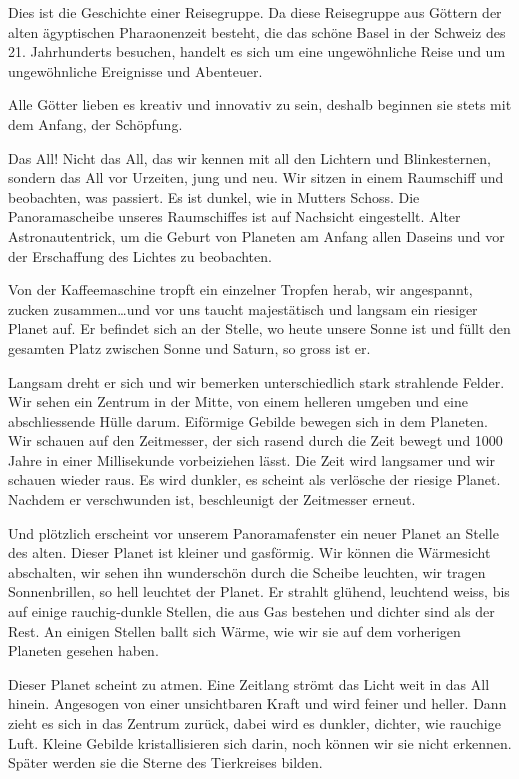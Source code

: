 \documentclass[11pt,titlepage,a5paper]{book}
\begin{document}
Dies ist die Geschichte einer Reisegruppe. Da diese Reisegruppe aus Göttern der alten ägyptischen Pharaonenzeit besteht, die das schöne Basel in der Schweiz des 21. Jahrhunderts besuchen, handelt es sich um eine ungewöhnliche Reise und um ungewöhnliche Ereignisse und Abenteuer. 

Alle Götter lieben es kreativ und innovativ zu sein, deshalb beginnen sie stets mit dem Anfang, der Schöpfung. 

Das All!  Nicht das All, das wir kennen mit all den Lichtern und Blinkesternen, sondern das All vor Urzeiten, jung und neu. Wir sitzen in einem Raumschiff und beobachten, was passiert. Es ist dunkel, wie in Mutters Schoss. Die Panoramascheibe unseres Raumschiffes ist auf Nachsicht eingestellt. Alter Astronautentrick, um die Geburt von Planeten am Anfang allen Daseins und vor der Erschaffung des Lichtes zu beobachten.

Von der Kaffeemaschine tropft ein einzelner Tropfen herab, wir angespannt, zucken zusammen\dots und vor uns taucht majestätisch und langsam ein riesiger Planet auf. Er befindet sich an der Stelle, wo heute unsere Sonne ist und füllt den gesamten Platz zwischen Sonne und Saturn, so gross ist er. 

Langsam dreht er sich und wir bemerken unterschiedlich stark strahlende Felder. Wir sehen ein Zentrum in der Mitte, von einem helleren umgeben und eine abschliessende Hülle darum. Eiförmige Gebilde  bewegen sich in dem Planeten. Wir schauen auf den Zeitmesser, der sich rasend durch die Zeit bewegt und 1000 Jahre in einer Millisekunde vorbeiziehen lässt. Die Zeit wird langsamer und wir schauen wieder raus. Es wird dunkler, es scheint als verlösche der riesige Planet. Nachdem er verschwunden ist, beschleunigt der Zeitmesser erneut. 

Und plötzlich erscheint vor unserem Panoramafenster ein neuer Planet an Stelle des alten. Dieser Planet ist kleiner und gasförmig. Wir können die Wärmesicht abschalten, wir sehen ihn wunderschön durch die Scheibe leuchten, wir tragen Sonnenbrillen, so hell leuchtet der Planet. Er strahlt glühend, leuchtend weiss, bis auf einige rauchig-dunkle Stellen, die aus Gas bestehen und dichter sind als der Rest. An einigen Stellen ballt sich Wärme, wie wir sie auf dem vorherigen Planeten gesehen haben.

Dieser Planet scheint zu atmen. Eine Zeitlang strömt das Licht weit in das All hinein. Angesogen von einer unsichtbaren Kraft und wird feiner und heller. Dann zieht es sich in das Zentrum zurück, dabei wird es dunkler, dichter, wie rauchige Luft. Kleine Gebilde kristallisieren sich darin, noch können wir sie nicht erkennen. Später werden sie die Sterne des Tierkreises bilden.
\end{document}
